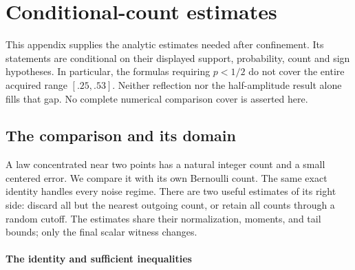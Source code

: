 \section{Conditional-count estimates}\label{v9:count:appendix}
\label{ms:fourier:local}
This appendix supplies the analytic estimates needed after confinement.
Its statements are conditional on their displayed support, probability,
count and sign hypotheses. In particular, the formulas requiring $p<1/2$
do not cover the entire acquired range $[.25,.53]$. Neither reflection nor
the half-amplitude result alone fills that gap. No complete numerical
comparison cover is asserted here.

\subsection{The comparison and its domain}\label{ms:fourier:cut49:shortloc:section}

A law concentrated near two points has a natural integer count and a small
centered error. We compare it with its own Bernoulli count. The same exact
identity handles every noise regime. There are two useful estimates of its
right side: discard all but the nearest outgoing count, or retain all counts
through a random cutoff. The estimates share their normalization, moments,
and tail bounds; only the final scalar witness changes.

\paragraph{The identity and sufficient inequalities}

